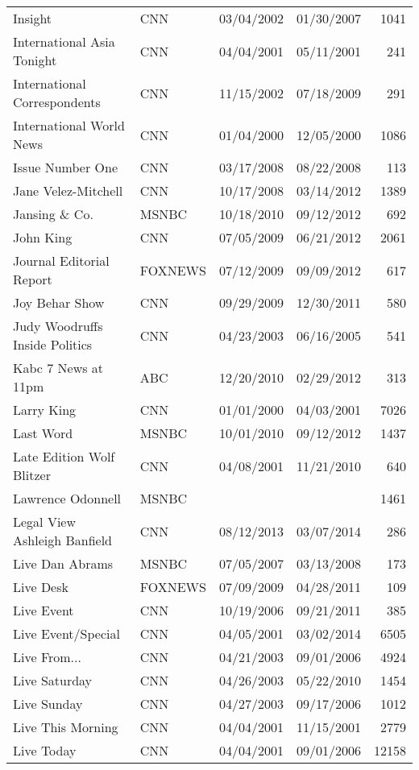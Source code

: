 {\begin{longtable}{llllr}
  Insight & CNN & 03/04/2002 & 01/30/2007 & 1041 \\ 
  International Asia Tonight & CNN & 04/04/2001 & 05/11/2001 & 241 \\ 
  International Correspondents & CNN & 11/15/2002 & 07/18/2009 & 291 \\ 
  International World News & CNN & 01/04/2000 & 12/05/2000 & 1086 \\ 
  Issue Number One & CNN & 03/17/2008 & 08/22/2008 & 113 \\ 
  Jane Velez-Mitchell & CNN & 10/17/2008 & 03/14/2012 & 1389 \\ 
  Jansing \& Co. & MSNBC & 10/18/2010 & 09/12/2012 & 692 \\ 
  John King & CNN & 07/05/2009 & 06/21/2012 & 2061 \\ 
  Journal Editorial Report & FOXNEWS & 07/12/2009 & 09/09/2012 & 617 \\ 
  Joy Behar Show & CNN & 09/29/2009 & 12/30/2011 & 580 \\ 
  Judy Woodruffs Inside Politics & CNN & 04/23/2003 & 06/16/2005 & 541 \\ 
  Kabc 7 News at 11pm & ABC & 12/20/2010 & 02/29/2012 & 313 \\ 
  Larry King & CNN & 01/01/2000 & 04/03/2001 & 7026 \\ 
  Last Word & MSNBC & 10/01/2010 & 09/12/2012 & 1437 \\ 
  Late Edition Wolf Blitzer & CNN & 04/08/2001 & 11/21/2010 & 640 \\ 
  Lawrence Odonnell & MSNBC &  &  & 1461 \\ 
  Legal View Ashleigh Banfield & CNN & 08/12/2013 & 03/07/2014 & 286 \\ 
  Live Dan Abrams & MSNBC & 07/05/2007 & 03/13/2008 & 173 \\ 
  Live Desk & FOXNEWS & 07/09/2009 & 04/28/2011 & 109 \\ 
  Live Event & CNN & 10/19/2006 & 09/21/2011 & 385 \\ 
  Live Event/Special & CNN & 04/05/2001 & 03/02/2014 & 6505 \\ 
  Live From... & CNN & 04/21/2003 & 09/01/2006 & 4924 \\ 
  Live Saturday & CNN & 04/26/2003 & 05/22/2010 & 1454 \\ 
  Live Sunday & CNN & 04/27/2003 & 09/17/2006 & 1012 \\ 
  Live This Morning & CNN & 04/04/2001 & 11/15/2001 & 2779 \\ 
  Live Today & CNN & 04/04/2001 & 09/01/2006 & 12158 \\ 

\end{longtable}}

